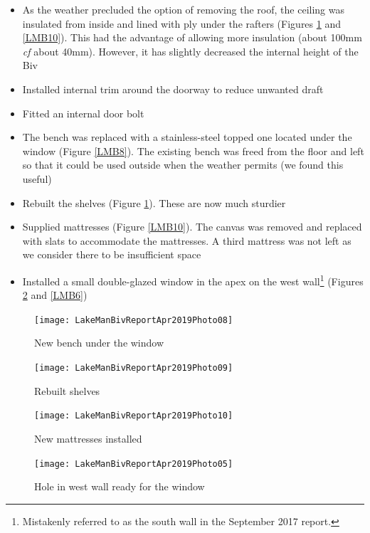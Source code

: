 \documentclass[12pt]{article} %
\begin{document}
\begin{itemize}
 \item As the weather precluded the option of removing the roof, the ceiling was insulated from inside and lined with ply under the rafters (Figures \ref{LMB9} and \ref{LMB10}).  This had the advantage of allowing more insulation (about 100mm \textit{cf} about 40mm).  However, it has slightly decreased the internal height of the Biv
 \item Installed internal trim around the doorway to reduce unwanted draft
 \item Fitted an internal door bolt
 \item The bench was replaced with a stainless-steel topped one located under the window (Figure \ref{LMB8}). The existing bench was freed from the floor and left so that it could be used outside when the weather permits (we found this useful)
 \item Rebuilt the shelves (Figure \ref{LMB9}).  These are now much sturdier
 \item Supplied mattresses (Figure \ref{LMB10}).  The canvas was removed and replaced with slats to accommodate the mattresses.  A third mattress was not left as we consider there to be insufficient space
 \item Installed a small double-glazed window in the apex on the west wall\footnote{Mistakenly referred to as the south wall in the September 2017 report.} (Figures \ref{LMB5} and \ref{LMB6})
\end{itemize}

\begin{figure}[ht]
\begin{minipage}{.5\linewidth}
\begin{flushleft}
   \texttt{[image: LakeManBivReportApr2019Photo08]}
   \caption{New bench under the window}
   \label{LMB8}
\end{flushleft}
\end{minipage}
\begin{minipage}{.5\linewidth}
\begin{center}
   \texttt{[image: LakeManBivReportApr2019Photo09]}
   \caption{Rebuilt shelves}
   \label{LMB9}
\end{center}
\end{minipage}
\end{figure}

\begin{figure}[ht]
\begin{minipage}{.5\linewidth}
\begin{flushleft}
   \texttt{[image: LakeManBivReportApr2019Photo10]}
   \caption{New mattresses installed}
   \label{LMB10}
\end{flushleft}
\end{minipage}
\begin{minipage}{.5\linewidth}
\begin{center}
   \texttt{[image: LakeManBivReportApr2019Photo05]}
   \caption{Hole in west wall ready for the window}
   \label{LMB5}
\end{center}
\end{minipage}
\end{figure}
\end{document}
